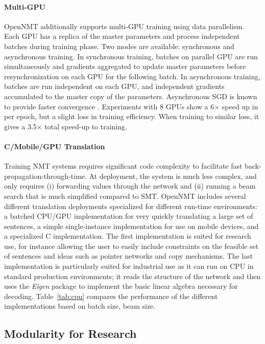 \documentclass[]{article}
\begin{document}
\paragraph{Multi-GPU} OpenNMT additionally supports multi-GPU training
using data parallelism. Each GPU has a replica of the master
parameters and process independent batches during training phase.  Two
modes are available: synchronous and asynchronous training.  In
synchronous training, batches on parallel GPU are run simultaneously
and gradients aggregated to update master parameters before
resynchronization on each GPU for the following batch.  In
asynchronous training, batches are run independent on each GPU, and
independent gradients accumulated to the master copy of the
parameters. Asynchronous SGD is known to provide faster convergence
\citep{dean2012large}. Experiments with 8 GPUs show a 6$\times$ speed up in
per epoch, but a slight loss in training efficiency. When training to similar
loss, it gives a 3.5$\times$ total speed-up to training.



\paragraph{C/Mobile/GPU Translation} Training NMT systems requires
significant code complexity to facilitate fast
back-propagation-through-time. At deployment, the system is much less
complex, and only requires (i) forwarding values through the network
and (ii) running a beam search that is much simplified compared to
SMT. OpenNMT includes several different translation deployments
specialized for different run-time environments: a batched CPU/GPU
implementation for very quickly translating a large set of sentences,
a simple single-instance implementation for use on mobile devices, and
a specialized C implementation. The first implementation is suited for
research use, for instance allowing the user to easily include
constraints on the feasible set of sentences and ideas such as pointer
networks and copy mechanisms. The last implementation is particularly
suited for industrial use as it can run on CPU in standard production
environments; it reads the structure of the network and then uses the
\textit{Eigen} package to implement the basic linear algebra necessary
for decoding. Table~\ref{tab:cpu} compares the performance of the
different implementations based on batch size, beam size.




\subsection{Modularity for Research}
\end{document}
